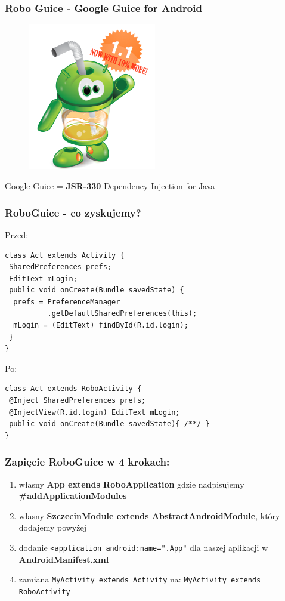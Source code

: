 \begin{frame}\frametitle{Robo Guice - Google Guice for Android}
 \begin{figure}[c]
 \includegraphics[width=0.5\textwidth]{images/roboguice}  
 \end{figure}
 
 \begin{center}
  Google Guice = \textbf{JSR-330} Dependency Injection for Java
 \end{center}
\end{frame}

\begin{frame}[fragile]\frametitle{RoboGuice - co zyskujemy?}
Przed:
\begin{lstlisting}
class Act extends Activity {
 SharedPreferences prefs;
 EditText mLogin;
 public void onCreate(Bundle savedState) {
  prefs = PreferenceManager
          .getDefaultSharedPreferences(this);
  mLogin = (EditText) findById(R.id.login);
 }
}
\end{lstlisting}

\pause

Po:
\begin{lstlisting}
class Act extends RoboActivity {
 @Inject SharedPreferences prefs;
 @InjectView(R.id.login) EditText mLogin;
 public void onCreate(Bundle savedState){ /**/ }
}
\end{lstlisting}

\end{frame}


\begin{frame}[fragile]\frametitle{Zapięcie RoboGuice w 4 krokach:}
\begin{enumerate}
 \item własny \textbf{App extends RoboApplication} gdzie nadpisujemy \textbf{\#addApplicationModules}
 \pause \item własny \textbf{SzczecinModule extends AbstractAndroidModule}, który dodajemy powyżej
 \pause \item dodanie \verb|<application android:name=".App"| dla naszej aplikacji w \textbf{AndroidManifest.xml}
 \pause \item zamiana \verb|MyActivity extends Activity| na: \verb|MyActivity extends RoboActivity|
\end{enumerate}
\end{frame}


